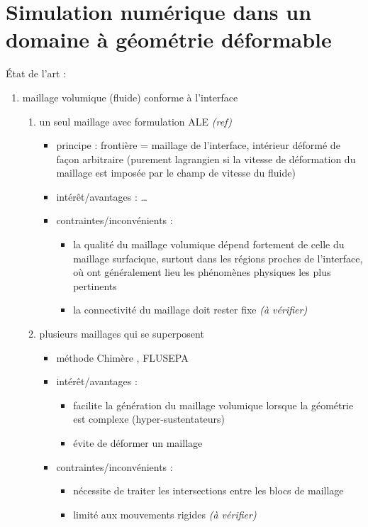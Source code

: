 \section{Simulation numérique dans un domaine à géométrie déformable}
État de l'art :
\begin{enumerate}
	\item maillage volumique (fluide) conforme à l'interface
	\begin{enumerate}
		\item \label{item:methodo_bodyfitted_ALE} un seul maillage  avec formulation ALE \emph{(ref)}
		\begin{itemize}
			\item principe : frontière = maillage de l'interface, intérieur déformé de façon arbitraire (purement lagrangien si la vitesse de déformation du maillage est imposée par le champ de vitesse du fluide)
			\item intérêt/avantages : \ldots
			\item contraintes/inconvénients : 
			\begin{itemize}
				\item la qualité du maillage volumique dépend fortement de celle du maillage surfacique, surtout dans les régions proches de l'interface, où ont généralement lieu les phénomènes physiques les plus pertinents
				\item la connectivité du maillage doit rester fixe \emph{(à vérifier)}
			\end{itemize}
		\end{itemize}
		
		\item plusieurs maillages  qui se superposent
		\begin{itemize}
			\item méthode Chimère \cite{meakin1989, wang2000}, FLUSEPA \cite{brenner1991}
			\item intérêt/avantages : 
			\begin{itemize}
				\item facilite la génération du maillage volumique lorsque la géométrie est complexe (\eg hyper-sustentateurs)
				\item évite de déformer un maillage \troisD
			\end{itemize}						
			\item contraintes/inconvénients : 
			\begin{itemize}
				\item nécessite de traiter les intersections entre les blocs de maillage
				\item limité aux mouvements rigides \emph{(à vérifier)}
			\end{itemize}
		\end{itemize}
	\end{enumerate}
	

\end{enumerate}
